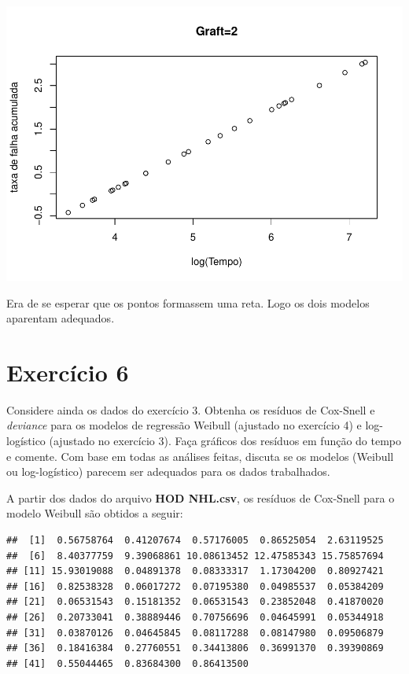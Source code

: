\documentclass[]{article}
\begin{document}
\begin{center}\includegraphics[width=0.8\linewidth]{Lista_3_files/figure-latex/unnamed-chunk-14-2} \end{center}

Era de se esperar que os pontos formassem uma reta. Logo os dois modelos
aparentam adequados.

\section{Exercício 6}\label{exercicio-6}

Considere ainda os dados do exercício 3. Obtenha os resíduos de
Cox-Snell e \emph{deviance} para os modelos de regressão Weibull
(ajustado no exercício 4) e log-logístico (ajustado no exercício 3).
Faça gráficos dos resíduos em função do tempo e comente. Com base em
todas as análises feitas, discuta se os modelos (Weibull ou
log-logístico) parecem ser adequados para os dados trabalhados.

A partir dos dados do arquivo \textbf{HOD NHL.csv}, os resíduos de
Cox-Snell para o modelo Weibull são obtidos a seguir:

\begin{verbatim}
##  [1]  0.56758764  0.41207674  0.57176005  0.86525054  2.63119525
##  [6]  8.40377759  9.39068861 10.08613452 12.47585343 15.75857694
## [11] 15.93019088  0.04891378  0.08333317  1.17304200  0.80927421
## [16]  0.82538328  0.06017272  0.07195380  0.04985537  0.05384209
## [21]  0.06531543  0.15181352  0.06531543  0.23852048  0.41870020
## [26]  0.20733041  0.38889446  0.70756696  0.04645991  0.05344918
## [31]  0.03870126  0.04645845  0.08117288  0.08147980  0.09506879
## [36]  0.18416384  0.27760551  0.34413806  0.36991370  0.39390869
## [41]  0.55044465  0.83684300  0.86413500
\end{verbatim}
\end{document}
